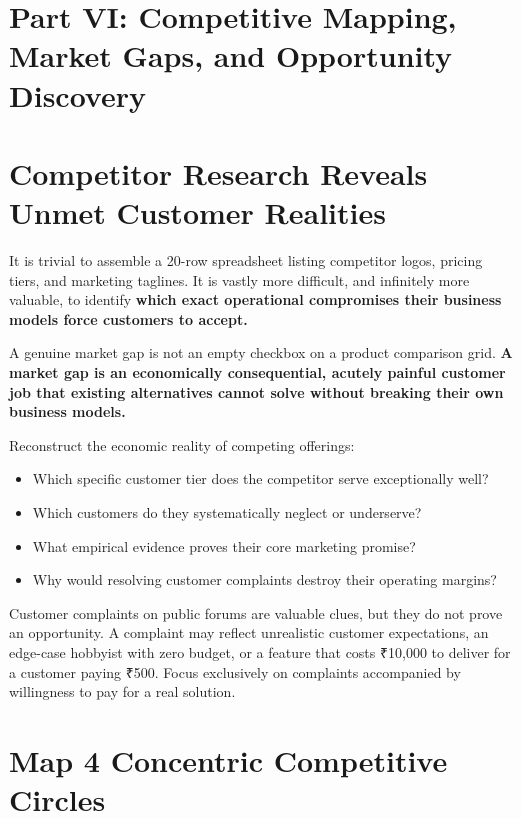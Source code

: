 \section*{Part VI: Competitive Mapping, Market Gaps, and Opportunity Discovery}

\section{Competitor Research Reveals Unmet Customer Realities}

It is trivial to assemble a 20-row spreadsheet listing competitor logos, pricing tiers, and marketing taglines. It is vastly more difficult, and infinitely more valuable, to identify \textbf{which exact operational compromises their business models force customers to accept.}

A genuine market gap is not an empty checkbox on a product comparison grid. \textbf{A market gap is an economically consequential, acutely painful customer job that existing alternatives cannot solve without breaking their own business models.}

Reconstruct the economic reality of competing offerings:
\begin{itemize}[leftmargin=12pt,itemsep=1pt,topsep=1pt]
  \item Which specific customer tier does the competitor serve exceptionally well?
  \item Which customers do they systematically neglect or underserve?
  \item What empirical evidence proves their core marketing promise?
  \item Why would resolving customer complaints destroy their operating margins?
\end{itemize}

Customer complaints on public forums are valuable clues, but they do not prove an opportunity. A complaint may reflect unrealistic customer expectations, an edge-case hobbyist with zero budget, or a feature that costs ₹10,000 to deliver for a customer paying ₹500. Focus exclusively on complaints accompanied by willingness to pay for a real solution.

\section{Map 4 Concentric Competitive Circles}

